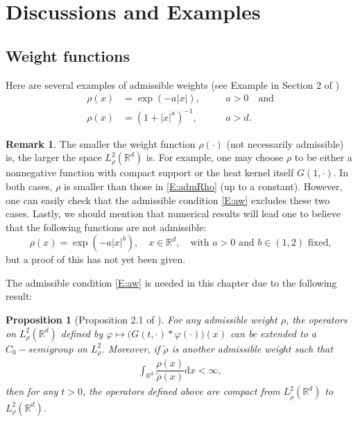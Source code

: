 \documentclass[12pt]{report}
\theoremstyle{plain}
\newtheorem{proposition}[theorem]{Proposition}
\theoremstyle{definition}
\newtheorem{remark}[theorem]{Remark}
\numberwithin{equation}{section}
\newcommand{\R}{\mathbb{R}}
\newcommand{\ud}{\ensuremath{ \mathrm{d} }}
\begin{document}



\section{Discussions and Examples} \label{S:Example}
\subsection{Weight functions} \label{SS:Weight}
Here are several examples of admissible weights (see Example in Section 2 of
\cite{tessitore.zabczyk:98:invariant})
\begin{equation} \label{E:admRho}
\begin{aligned}
\rho(x) & = \exp(-a|x|), \quad               &  & a>0 \quad \text{and} \\
\rho(x) & = \left(1+|x|^a\right)^{-1}, \quad &  & a>d.
\end{aligned}
\end{equation}

\begin{remark} \label{R:admRho}
	The smaller the weight function $\rho(\cdot)$ (not necessarily admissible) is, the larger the
	space $L_\rho^2(\R^d)$ is. For example, one may choose $\rho$ to be either a nonnegative function
	with compact support or the heat kernel itself $G(1,\cdot)$. In both cases, $\rho$ is smaller than
	those in \eqref{E:admRho} (up to a constant). However, one can easily check that the admissible
	condition \eqref{E:aw} excludes these two cases. Lastly, we should mention that numerical results will lead one to believe that the following functions are not admissible:
	\begin{equation*}
	\rho(x) = \exp\left(-a |x|^b\right), \quad x\in\R^d,
	\quad \text{with $a>0$ and $b\in (1,2)$ fixed,}
	\end{equation*}
	but a proof of this has not yet been given.
\end{remark}

The admissible condition \ref{E:aw} is needed in this chapter due to the following result:

\begin{proposition}[Proposition 2.1 of \cite{tessitore.zabczyk:98:invariant}] \label{P:weight}
	For any admissible weight $\rho$, the operators on $L^2_\rho(\R^d)$ defined by $\varphi \mapsto
	\big(G(t,\cdot)*\varphi(\cdot)\big)(x)$ can be extended to a $C_0-semigroup$ on $L^2_\rho$.
	Moreover, if $\tilde{\rho}$ is another admissible weight such that
	\begin{align*}
	\int_{\R^d}\dfrac{\rho(x)}{\tilde{\rho}(x)}\ud x < \infty,
	\end{align*}
	then for any $t>0$, the operators defined above are compact from $L^2_{\tilde{\rho}}(\R^d)$ to
	$L^2_\rho(\R^d)$.
\end{proposition}
\end{document}

